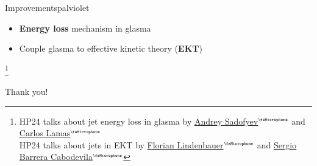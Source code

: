 \documentclass[aspectratio=169,11pt,usenames,dvipsnames]{beamer}
\renewcommand{\thefootnote}{\color{customblue}\faPaperPlaneO}
\newcommand\blfootnote[1]{%
  \begingroup
  \renewcommand\thefootnote{}\footnote{#1}%
  \addtocounter{footnote}{-1}%
  \endgroup
}
\begin{document}
\begin{frame}
\begin{center}

        \begin{custombox2}{Improvements}{palviolet}
            \small
            \begin{varwidth}{0.55\textwidth}
            \begin{itemize}\itemsep0em 
                \itemsep0em
                \item \textbf{\color{palviolet}Energy loss} mechanism in glasma
                \item Couple glasma to effective kinetic theory (\textbf{\color{palviolet}EKT})
            \end{itemize}
            \end{varwidth}
        \end{custombox2}
    \end{center}

    \blfootnote{\scriptsize HP24 talks about jet energy loss in glasma by \href{https://indico.cern.ch/event/1339555/contributions/6040922/}{{\color{palviolet}Andrey Sadofyev$^\text{\tiny\faMicrophone}$}} and \href{https://indico.cern.ch/event/1339555/contributions/6040797/}{{\color{palviolet}Carlos Lamas$^\text{\tiny\faMicrophone}$}}\\
    \hspace{16.5pt}HP24 talks about jets in EKT by \href{https://indico.cern.ch/event/1339555/contributions/6040912/}{{\color{palviolet}Florian Lindenbauer$^\text{\tiny\faMicrophone}$}} and \href{https://indico.cern.ch/event/1339555/contributions/6040914/}{{\color{palviolet}Sergio Barrera Cabodevila$^\text{\tiny\faMicrophone}$}}
    }
\end{frame}

\begin{frame}{}
    \vspace{20pt}
    \huge\centering Thank you!
\end{frame}


\end{document}
